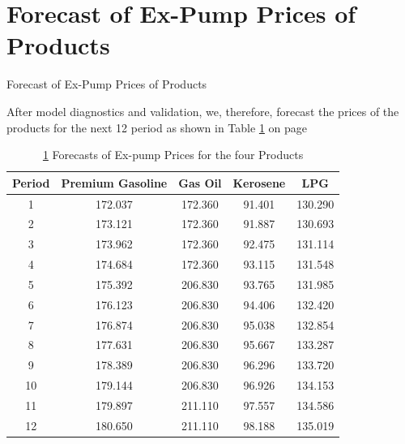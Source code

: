 \documentclass{beamer}
\newcommand{\vspaceTen}{\vspace{10pt}}
\begin{document}
	\section{Forecast of Ex-Pump Prices of Products}
	\begin{frame}{Forecast of Ex-Pump Prices of Products}
		\begin{block}{}
			\vspaceTen
			After model diagnostics and validation, we, therefore, forecast the prices of the products for the next 12 period as shown in Table \ref{table:forecast} on page \pageref{table:forecast}
			\vspaceTen
		\end{block}
	\end{frame}
	\begin{frame}
		\begin{table}
			\caption{ \ref{table:forecast} Forecasts of Ex-pump Prices for the four Products}
			\label{table:forecast}
			
			\begin{tabular}{ccccc}
				\toprule
				Period & Premium Gasoline & Gas Oil & Kerosene & LPG \\
				\midrule
				
				1 & 172.037 & 172.360 & 91.401 & 130.290 \\
				2 & 173.121 & 172.360 & 91.887 & 130.693 \\
				3 & 173.962 & 172.360 & 92.475 & 131.114 \\
				4 & 174.684 & 172.360 & 93.115 & 131.548 \\
				5 & 175.392 & 206.830 & 93.765 & 131.985 \\
				6 & 176.123 & 206.830 & 94.406 & 132.420 \\
				7 & 176.874 & 206.830 & 95.038 & 132.854 \\
				8 & 177.631 & 206.830 & 95.667 & 133.287 \\
				9 & 178.389 & 206.830 & 96.296 & 133.720 \\
				10 & 179.144 & 206.830 & 96.926 & 134.153 \\
				11 & 179.897 & 211.110 & 97.557 & 134.586 \\
				12 & 180.650 & 211.110 & 98.188 & 135.019 \\
				
				\bottomrule
			\end{tabular}
		\end{table}
		
	\end{frame}
	
	
	
	
	
	
\end{document}
